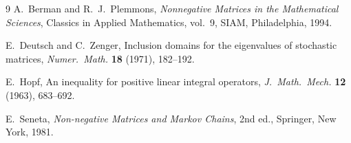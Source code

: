 \documentclass[11pt]{article}
\theoremstyle{definition}
\begin{document}
\begin{thebibliography}{9}
A.~Berman and R.~J.~Plemmons,
\emph{Nonnegative Matrices in the Mathematical Sciences},
Classics in Applied Mathematics, vol.~9, SIAM, Philadelphia, 1994.

E.~Deutsch and C.~Zenger,
Inclusion domains for the eigenvalues of stochastic matrices,
\emph{Numer.\ Math.} \textbf{18} (1971), 182--192.

E.~Hopf,
An inequality for positive linear integral operators,
\emph{J.\ Math.\ Mech.} \textbf{12} (1963), 683--692.

E.~Seneta,
\emph{Non-negative Matrices and Markov Chains},
2nd ed., Springer, New York, 1981.
\end{thebibliography}
\end{document}
